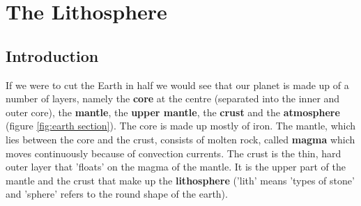 \chapter{The Lithosphere}
\label{chap:lith}



\section{Introduction}
\label{sec:lith:intro}

If we were to cut the Earth in half we would see that our planet is made up of a number of layers, namely the \textbf{core} at the centre (separated into the inner and outer core), the \textbf{mantle}, the \textbf{upper mantle}, the \textbf{crust} and the \textbf{atmosphere} (figure \ref{fig:earth section}). The core is made up mostly of iron. The mantle, which lies between the core and the crust, consists of molten rock, called \textbf{magma} which moves continuously because of convection currents. The crust is the thin, hard outer layer that 'floats' on the magma of the mantle. It is the upper part of the mantle and the crust that make up the \textbf{lithosphere} ('lith' means 'types of stone' and 'sphere' refers to the round shape of the earth). \\
